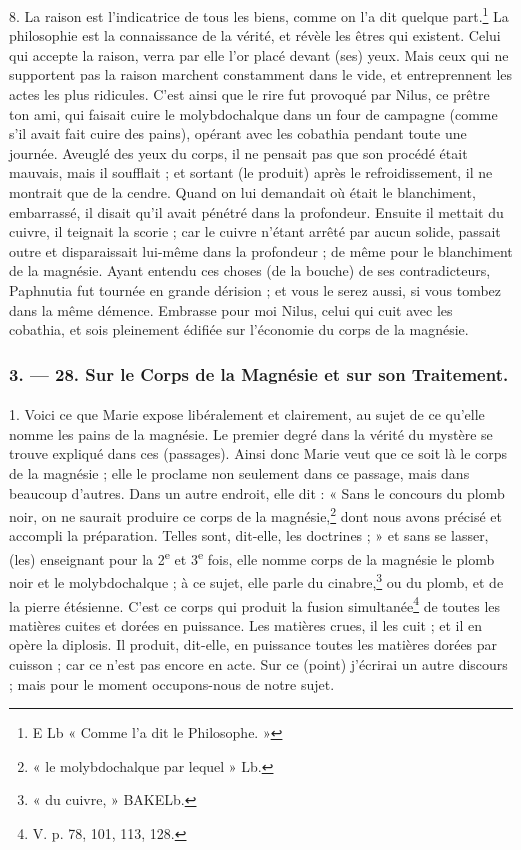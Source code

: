 \documentclass[a4paper, 11pt, oneside, polutonikogreek, french]{article}
\begin{document}
8. La raison est l'indicatrice de tous les biens, comme on l'a dit quelque part.\footnote{E Lb « Comme l'a dit le Philosophe. »} La philosophie est la connaissance de la vérité, et révèle les êtres qui existent. Celui qui accepte la raison, verra par elle l'or placé devant (ses) yeux. Mais ceux qui ne supportent pas la raison marchent constamment dans le vide, et entreprennent les actes les plus ridicules. C'est ainsi que le rire fut provoqué par Nilus, ce prêtre ton ami, qui faisait cuire le molybdochalque dans un four de campagne (comme s'il avait fait cuire des pains), opérant avec les cobathia pendant toute une journée. Aveuglé des yeux du corps, il ne pensait pas que son procédé était mauvais, mais il soufflait ; et sortant (le produit) après le refroidissement, il ne montrait que de la cendre. Quand on lui demandait où était le blanchiment, embarrassé, il disait qu'il avait pénétré dans la profondeur. Ensuite il mettait du cuivre, il teignait la scorie ; car le cuivre n'étant arrêté par aucun solide, passait outre et disparaissait lui-même dans la profondeur ; de même pour le blanchiment de la magnésie. Ayant entendu ces choses (de la bouche) de ses contradicteurs, Paphnutia fut tournée en grande dérision ; et vous le serez aussi, si vous tombez dans la même démence. Embrasse pour moi Nilus, celui qui cuit avec les cobathia, et sois pleinement édifiée sur l'économie du corps de la magnésie.

\bigskip
\centerline{\EightStarTaper}
\centerline{\EightStarTaper\EightStarTaper}
\bigskip

\subsubsection{3. --- 28. Sur le Corps de la Magnésie et sur son Traitement.}
\paragraph{}
1. Voici ce que Marie expose libéralement et clairement, au sujet de ce qu'elle nomme les pains de la magnésie. Le premier degré dans la vérité du mystère se trouve expliqué dans ces (passages). Ainsi donc Marie veut que ce soit là le corps de la magnésie ; elle le proclame non seulement dans ce passage, mais dans beaucoup d'autres. Dans un autre endroit, elle dit : « Sans le concours du plomb noir, on ne saurait produire ce corps de la magnésie,\footnote{« le molybdochalque par lequel » Lb.} dont nous avons précisé et accompli la préparation. Telles sont, dit-elle, les doctrines ; » et sans se lasser, (les) enseignant pour la 2\textsuperscript{e} et 3\textsuperscript{e} fois, elle nomme corps de la magnésie le plomb noir et le molybdochalque ; à ce sujet, elle parle du cinabre,\footnote{« du cuivre, » BAKELb.} ou du plomb, et de la pierre étésienne. C'est ce corps qui produit la fusion simultanée\footnote{V. p. 78, 101, 113, 128.} de toutes les matières cuites et dorées en puissance. Les matières crues, il les cuit ; et il en opère la diplosis. Il produit, dit-elle, en puissance toutes les matières dorées par cuisson ; car ce n'est pas encore en acte. Sur ce (point) j'écrirai un autre discours ; mais pour le moment occupons-nous de notre sujet.
\end{document}
